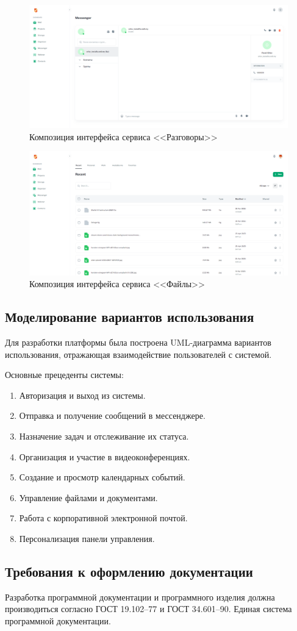\begin{figure}[ht]
	\centering
	\includegraphics[width=1\linewidth]{images/разговоры}
	\caption{Композиция интерфейса сервиса <<Разговоры>>}
	\label{templ:image8}
\end{figure}


\begin{figure}[ht]
	\centering
	\includegraphics[width=1\linewidth]{images/файлы}
	\caption{Композиция интерфейса сервиса <<Файлы>>}
	\label{templ:image9}
\end{figure}

\clearpage
\subsection{Моделирование вариантов использования}

Для разработки платформы была построена UML-диаграмма вариантов использования, отражающая взаимодействие пользователей с системой.

Основные прецеденты системы:
\begin{enumerate}
\item Авторизация и выход из системы.
\item Отправка и получение сообщений в мессенджере.
\item Назначение задач и отслеживание их статуса.
\item Организация и участие в видеоконференциях.
\item Создание и просмотр календарных событий.
\item Управление файлами и документами.
\item Работа с корпоративной электронной почтой.
\item Персонализация панели управления.
\end{enumerate}

\subsection{Требования к оформлению документации}

Разработка программной документации и программного изделия должна производиться согласно ГОСТ 19.102–77 и ГОСТ 34.601–90. Единая система программной документации.
